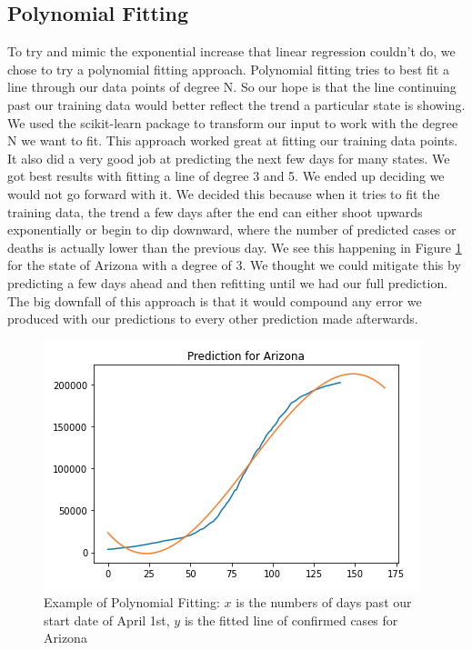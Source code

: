 \documentclass[sigconf,nonacm]{acmart}
\begin{document}
\subsection{Polynomial Fitting}
To try and mimic the exponential increase that linear regression couldn't do, we chose to try a polynomial fitting approach. Polynomial fitting tries to best fit a line through our data points of degree N. So our hope is that the line continuing past our training data would better reflect the trend a particular state is showing. We used the scikit-learn package to transform our input to work with the degree N we want to fit\cite{scikit-learn}. This approach worked great at fitting our training data points. It also did a very good job at predicting the next few days for many states. We got best results with fitting a line of degree 3 and 5. We ended up deciding we would not go forward with it. We decided this because when it tries to fit the training data, the trend a few days after the end can either shoot upwards exponentially or begin to dip downward, where the number of predicted cases or deaths is actually lower than the previous day. We see this happening in Figure \ref{fig:polyfit} for the state of Arizona with a degree of 3. We thought we could mitigate this by predicting a few days ahead and then refitting until we had our full prediction. The big downfall of this approach is that it would compound any error we produced with our predictions to every other prediction made afterwards.
\begin{figure}
  \centering
  \includegraphics[width=\linewidth]{figures/7-poly-fit.png}
  \caption{Example of Polynomial Fitting: $x$ is the numbers of days past our start date of April 1st, $y$ is the fitted line of confirmed cases for Arizona}
  \label{fig:polyfit}
\end{figure}
\end{document}
